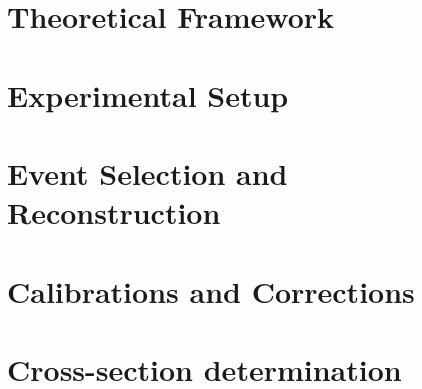 \documentclass[12pt,a4paper,reqno,twoside,final]{scrbook}%
\numberwithin{equation}{subsection}
\begin{document}
\chapter{Theoretical Framework}
\label{ch:theory}


\chapter{Experimental Setup}
\label{ch:expsetup}


\chapter{Event Selection and Reconstruction}
\label{ch:selectionreco}


\chapter{Calibrations and Corrections}
\label{ch:calibcorr}


\chapter{Cross-section determination}
\label{ch:unfolding}

\end{document}
